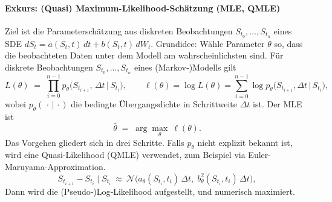 \paragraph{Exkurs: (Quasi) Maximum-Likelihood-Schätzung (MLE, QMLE)}
Ziel ist die Parameterschätzung aus diskreten Beobachtungen $S_{t_0},\dots,S_{t_n}$ eines SDE
$dS_t=a(S_t,t)\,dt+b(S_t,t)\,dW_t$. Grundidee: Wähle Parameter $\theta$ so, dass die beobachteten Daten unter dem Modell am wahrscheinlichsten sind. Für diskrete Beobachtungen $S_{t_0},\dots,S_{t_n}$ eines (Markov‑)Modells gilt
$$
L(\theta) \;=\; \prod_{i=0}^{n-1} p_\theta\!\big(S_{t_{i+1}},\,\Delta t \,\big|\, S_{t_i}\big), 
\qquad
\ell(\theta)=\log L(\theta)=\sum_{i=0}^{n-1}\log p_\theta\!\big(S_{t_{i+1}},\Delta t \,\big|\, S_{t_i}\big),
$$
wobei $p_\theta(\,\cdot\,|\,\cdot)$ die bedingte Übergangsdichte in Schrittweite $\Delta t$ ist. Der MLE ist
$$
\widehat\theta\;=\;\arg\max_{\theta}\ \ell(\theta).
$$
Das Vorgehen gliedert sich in drei Schritte. Falls $p_\theta$ nicht explizit bekannt ist, wird eine Quasi-Likelihood (QMLE) verwendet, zum Beispiel via Euler-Maruyama-Approximation.
$$
S_{t_{i+1}}-S_{t_i}\mid S_{t_i}\ \approx\ \mathcal N\!\big(a_\theta(S_{t_i},t_i)\,\Delta t,\; b_\theta^2(S_{t_i},t_i)\,\Delta t\big),
$$
Dann wird die (Pseudo‑)Log‑Likelihood aufgestellt, und numerisch maximiert.

